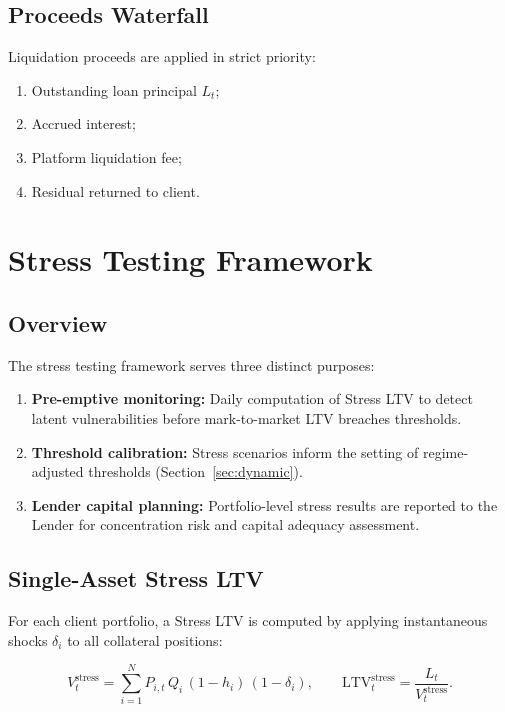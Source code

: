 \documentclass[12pt, a4paper]{article}
\newcommand{\LTV}{\mathrm{LTV}}
\newcommand{\1}{\mathbbm{1}}
\begin{document}
\subsection{Proceeds Waterfall}

Liquidation proceeds are applied in strict priority:
\begin{enumerate}[leftmargin=1.5em]
    \item Outstanding loan principal $L_t$;
    \item Accrued interest;
    \item Platform liquidation fee;
    \item Residual returned to client.
\end{enumerate}

\section{Stress Testing Framework}
\label{sec:stress}

\subsection{Overview}

The stress testing framework serves three distinct purposes:
\begin{enumerate}[leftmargin=1.5em]
    \item \textbf{Pre-emptive monitoring:} Daily computation of Stress LTV to
    detect latent vulnerabilities before mark-to-market LTV breaches thresholds.
    \item \textbf{Threshold calibration:} Stress scenarios inform the setting of
    regime-adjusted thresholds (Section~\ref{sec:dynamic}).
    \item \textbf{Lender capital planning:} Portfolio-level stress results are
    reported to the Lender for concentration risk and capital adequacy assessment.
\end{enumerate}

\subsection{Single-Asset Stress LTV}

For each client portfolio, a Stress LTV is computed by applying instantaneous
shocks $\delta_i$ to all collateral positions:

\begin{equation}
    V_t^{\mathrm{stress}} = \sum_{i=1}^{N} P_{i,t}\,Q_i\,(1-h_i)\,(1-\delta_i),
    \qquad
    \LTV_t^{\mathrm{stress}} = \frac{L_t}{V_t^{\mathrm{stress}}}.
    \label{eq:stress_ltv}
\end{equation}
\end{document}
